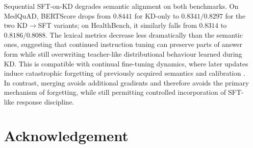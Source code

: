 \documentclass[conference]{IEEEtran}
\begin{document}
Sequential SFT-on-KD degrades semantic alignment on both benchmarks. On MedQuAD, BERTScore drops from $0.8441$ for KD-only to $0.8341/0.8297$ for the two KD$\rightarrow$SFT variants; on HealthBench, it similarly falls from $0.8314$ to $0.8186/0.8088$. The lexical metrics decrease less dramatically than the semantic ones, suggesting that continued instruction tuning can preserve parts of answer form while still overwriting teacher-like distributional behaviour learned during KD. This is compatible with continual fine-tuning dynamics, where later updates induce catastrophic forgetting of previously acquired semantics and calibration \cite{luo2023catastrophic}. In contrast, merging avoids additional gradients and therefore avoids the primary mechanism of forgetting, while still permitting controlled incorporation of SFT-like response discipline.


\section{Acknowledgement}


\end{document}
